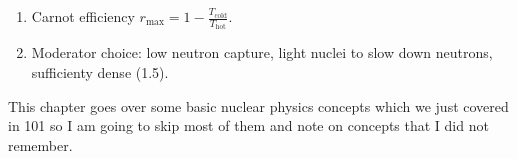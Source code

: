 \documentclass{school-22.211-notes}
\begin{document}
\clearpage
\begin{enumerate}
\item Carnot efficiency $r_{\mathrm{max}} = 1 - \frac{T_{\mathrm{cold}}}{T_{\mathrm{hot}}}$. 
\item Moderator choice: low neutron capture, light nuclei to slow down neutrons, sufficienty dense (1.5). 
\end{enumerate}

This chapter goes over some basic nuclear physics concepts which we just covered in 101 so I am going to skip most of them and note on concepts that I did not remember.
\end{document}
